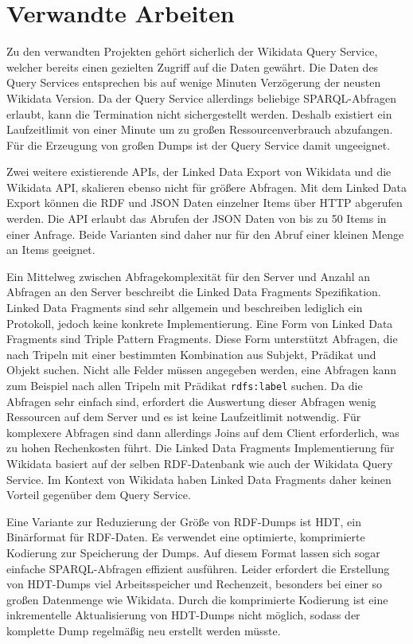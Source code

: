 \section{Verwandte Arbeiten}
Zu den verwandten Projekten gehört sicherlich der Wikidata Query Service\cite{wd-sparql}, welcher bereits einen gezielten Zugriff auf die Daten gewährt.
Die Daten des Query Services entsprechen bis auf wenige Minuten Verzögerung der neusten Wikidata Version.
Da der Query Service allerdings beliebige SPARQL-Abfragen erlaubt, kann die Termination nicht sichergestellt werden.
Deshalb existiert ein Laufzeitlimit von einer Minute um zu großen Ressourcenverbrauch abzufangen.
Für die Erzeugung von großen Dumps ist der Query Service damit ungeeignet.

Zwei weitere existierende APIs, der Linked Data Export von Wikidata und die Wikidata API, skalieren ebenso nicht für größere Abfragen.
Mit dem Linked Data Export können die RDF und JSON Daten einzelner Items über HTTP abgerufen werden.
Die API erlaubt das Abrufen der JSON Daten von bis zu 50 Items in einer Anfrage.
Beide Varianten sind daher nur für den Abruf einer kleinen Menge an Items geeignet.

Ein Mittelweg zwischen Abfragekomplexität für den Server und Anzahl an Abfragen an den Server beschreibt die Linked Data Fragments\cite{ldf} Spezifikation.
Linked Data Fragments sind sehr allgemein und beschreiben lediglich ein Protokoll, jedoch keine konkrete Implementierung.
Eine Form von Linked Data Fragments sind Triple Pattern Fragments.
Diese Form unterstützt Abfragen, die nach Tripeln mit einer bestimmten Kombination aus Subjekt, Prädikat und Objekt suchen.
Nicht alle Felder müssen angegeben werden, eine Abfragen kann zum Beispiel nach allen Tripeln mit Prädikat \verb|rdfs:label| suchen.
Da die Abfragen sehr einfach sind, erfordert die Auswertung dieser Abfragen wenig Ressourcen auf dem Server und es ist keine Laufzeitlimit notwendig.
Für komplexere Abfragen sind dann allerdings Joins auf dem Client erforderlich, was zu hohen Rechenkosten führt.
Die Linked Data Fragments Implementierung für Wikidata basiert auf der selben RDF-Datenbank wie auch der Wikidata Query Service.
Im Kontext von Wikidata haben Linked Data Fragments daher keinen Vorteil gegenüber dem Query Service.

Eine Variante zur Reduzierung der Größe von RDF-Dumps ist HDT\cite{hdt}, ein Binärformat für RDF-Daten.
Es verwendet eine optimierte, komprimierte Kodierung zur Speicherung der Dumps.
Auf diesem Format lassen sich sogar einfache SPARQL-Abfragen effizient ausführen\cite{hdt-query}.
Leider erfordert die Erstellung von HDT-Dumps viel Arbeitsspeicher und Rechenzeit, besonders bei einer so großen Datenmenge wie Wikidata.
Durch die komprimierte Kodierung ist eine inkrementelle Aktualisierung von HDT-Dumps nicht möglich, sodass der komplette Dump regelmäßig neu erstellt werden müsste.

